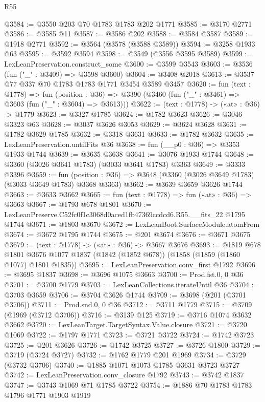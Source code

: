 \begin{lexlean}{R55}
\begin{coremodule}
@3584 := @3550 @203 @70 @1783 @1783 @202 @1771
@3585 := @3170 @2771
@3586 := @3585 @11
@3587 := @3586 @202
@3588 := @3584 @3587
@3589 := @1918 @2771
@3592 := @3564 (@3578 (@3588 @3589))
@3594 := @3258 @1933 @63
@3595 := @3592 @3594
@3598 := @3549 (@3556 @3595 @3589)
@3599 := LexLeanPreservation.construct_some
@3600 := @3599 @3543
@3603 := @3536 (fun ("_" : @3409) => @3598 @3600)
@3604 := @3408 @2018
@3613 := @3537 @77 @337 @70 @1783 @1783 @1771 @3454 @3589 @3457
@3620 := fun (text : @1778) =>
  fun (position : @36) => @3390 (@3460 (fun ("_" : @3461) => @3603 (fun ("_" : @3604) => @3613)))
@3622 := (text : @1778) -> («at» : @36) -> @1779
@3623 := @3327 @1785
@3624 := @1782 @3623
@3626 := @3046 @3323 @63
@3628 := @3037 @3626 @3053
@3629 := @3624 @3628
@3631 := @1782 @3629 @1785
@3632 := @3318 @3631
@3633 := @1782 @3632
@3635 := LexLeanPreservation.untilFits @36
@3638 := fun (__p0 : @36) => @3353 @1933 @1744
@3639 := @3635 @3638
@3641 := @3076 @1933 @1744
@3648 := @3360 (@3026 @3641 @1783) (@3033 @3641 @1783) @3363
@3649 := @3333 @3396
@3659 := fun (position : @36) => @3648 (@3360 (@3026 @3649 @1783) (@3033 @3649 @1783) @3368 @3363)
@3662 := @3639 @3659 @3626 @1744
@3663 := @3633 @3662
@3665 := fun (text : @1778) => fun («at» : @36) => @3663
@3667 := @1793 @678 @1801
@3670 := LexLeanPreserve.C52fc0f1c3068d0aced1fb47369ccdcd6.R55.__fits_22 @1795 @1744
@3671 := @1803 @3670
@3672 := LexLeanBoot.SurfaceModule.atomFrom
@3674 := @3672 @1795 @1744
@3675 := @201 @3674
@3676 := @3671 @3675
@3679 := (text : @1778) -> («at» : @36) -> @3667 @3676
@3693 := @1819
    @678
    @1801
    @3676
    @1077
    @1837
    (@1842 (@1852 @678))
    (@1858 (@1859 (@1860 @1077) @1801 @1835))
@3695 := LexLeanPreservation.conv_first @1792
@3696 := @3695 @1837
@3698 := @3696 @1075 @3663
@3700 := Prod.fst.{0, 0} @36
@3701 := @3700 @1779
@3703 := LexLeanCollections.iterateUntil @36
@3704 := @3703 @3659
@3706 := @3704 @3626 @1744
@3709 := @3698 (@201 (@3701 @3706))
@3711 := Prod.snd.{0, 0} @36
@3712 := @3711 @1779
@3715 := @3709 (@1969 (@3712 @3706))
@3716 := @3139 @125
@3719 := @3716 @1074 @3632 @3662
@3720 := LexLeanTarget.TargetSyntax.Value.closure
@3721 := @3720 @1069
@3722 := @1797 @1771
@3723 := @3721 @3722
@3724 := @1742 @3723
@3725 := @201 @3626
@3726 := @1742 @3725
@3727 := @3726 @1800
@3729 := @3719 (@3724 @3727)
@3732 := @1762 @1779 @201 @1969
@3734 := @3729 (@3732 @3706)
@3740 := @1885 @1071 @1073 @1785 @3631 @3723 @3727
@3742 := LexLeanPreservation.conv_closure @1792
@3743 := @3742 @1837
@3747 := @3743 @1069 @71 @1785 @3722
@3754 := @1886 @70 @1783 @1783 @1796 @1771 @1903 @1919

\end{coremodule}
\end{lexlean}
